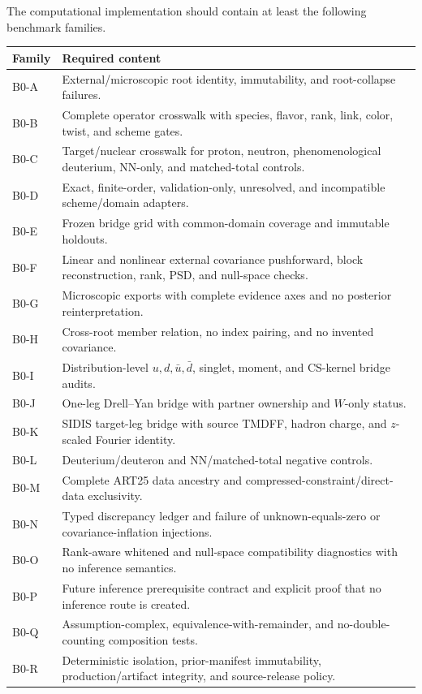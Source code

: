 \documentclass[11pt]{article}
\begin{document}
The computational implementation should contain at least the following benchmark families.

\begin{longtable}{L{0.15\textwidth}L{0.76\textwidth}}
\toprule
Family & Required content\\
\midrule
\endhead
B0-A & External/microscopic root identity, immutability, and root-collapse failures.\\
B0-B & Complete operator crosswalk with species, flavor, rank, link, color, twist, and scheme gates.\\
B0-C & Target/nuclear crosswalk for proton, neutron, phenomenological deuterium, NN-only, and matched-total controls.\\
B0-D & Exact, finite-order, validation-only, unresolved, and incompatible scheme/domain adapters.\\
B0-E & Frozen bridge grid with common-domain coverage and immutable holdouts.\\
B0-F & Linear and nonlinear external covariance pushforward, block reconstruction, rank, PSD, and null-space checks.\\
B0-G & Microscopic exports with complete evidence axes and no posterior reinterpretation.\\
B0-H & Cross-root member relation, no index pairing, and no invented covariance.\\
B0-I & Distribution-level \(u,d,\bar u,\bar d\), singlet, moment, and CS-kernel bridge audits.\\
B0-J & One-leg Drell--Yan bridge with partner ownership and \(W\)-only status.\\
B0-K & SIDIS target-leg bridge with source TMDFF, hadron charge, and \(z\)-scaled Fourier identity.\\
B0-L & Deuterium/deuteron and NN/matched-total negative controls.\\
B0-M & Complete ART25 data ancestry and compressed-constraint/direct-data exclusivity.\\
B0-N & Typed discrepancy ledger and failure of unknown-equals-zero or covariance-inflation injections.\\
B0-O & Rank-aware whitened and null-space compatibility diagnostics with no inference semantics.\\
B0-P & Future inference prerequisite contract and explicit proof that no inference route is created.\\
B0-Q & Assumption-complex, equivalence-with-remainder, and no-double-counting composition tests.\\
B0-R & Deterministic isolation, prior-manifest immutability, production/artifact integrity, and source-release policy.\\
\bottomrule
\end{longtable}
\end{document}
